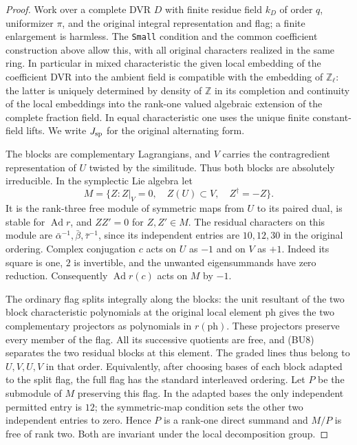 \begin{proof}
Work over a complete DVR $D$ with finite residue field
$k_D$ of order $q$, uniformizer $\pi$, and the original
integral representation and flag; a finite enlargement
is harmless. The \texttt{Small} condition and the common
coefficient construction above allow this, with all original
characters realized in the same ring. In particular in
mixed characteristic the given local embedding of the
coefficient DVR into the ambient field is compatible with
the embedding of $\mathbb Z_\ell$: the latter is uniquely
determined by density of $\mathbb Z$ in its completion
and continuity of the local embeddings into the rank-one
valued algebraic extension of the complete fraction field.
In equal characteristic one uses the unique finite
constant-field lifts. We write $J_{\rm sp}$ for the
original alternating form.

The blocks are complementary Lagrangians, and $V$ carries
the contragredient representation of $U$ twisted by the
similitude. Thus both blocks are absolutely irreducible.
In the symplectic Lie algebra let
\[
 M=\{Z:Z|_V=0,\quad Z(U)\subset V,\quad
                Z^\dagger=-Z\}.
\]
It is the rank-three free module of symmetric maps
from $U$ to its paired dual, is stable for
$\operatorname{Ad}r$, and $ZZ'=0$ for $Z,Z'\in M$.
The residual characters on this module are
$\bar\alpha^{-1},\bar\beta,\bar\tau^{-1}$, since its
independent entries are $10,12,30$ in the original
ordering. Complex conjugation $c$ acts on $U$ as $-1$
and on $V$ as $+1$. Indeed its square is one,
$2$ is invertible, and the unwanted eigensummands
have zero reduction. Consequently $\operatorname{Ad}r(c)$
acts on $M$ by $-1$.

The ordinary flag splits integrally along the blocks:
the unit resultant of the two block characteristic
polynomials at the original local element $\mathrm{ph}$
gives the two complementary projectors as polynomials
in $r(\mathrm{ph})$. These projectors preserve every
member of the flag. All its successive quotients
are free, and (BU8) separates the two residual
blocks at this element. The graded lines thus belong
to $U,V,U,V$ in that order. Equivalently, after choosing
bases of each block adapted to the split flag, the
full flag has the standard interleaved ordering.
Let $P$ be the submodule of $M$ preserving this
flag. In the adapted bases the only independent
permitted entry is $12$; the symmetric-map condition
sets the other two independent entries to zero.
Hence $P$ is a rank-one direct summand and $M/P$
is free of rank two. Both are invariant under the
local decomposition group.


\end{proof}
